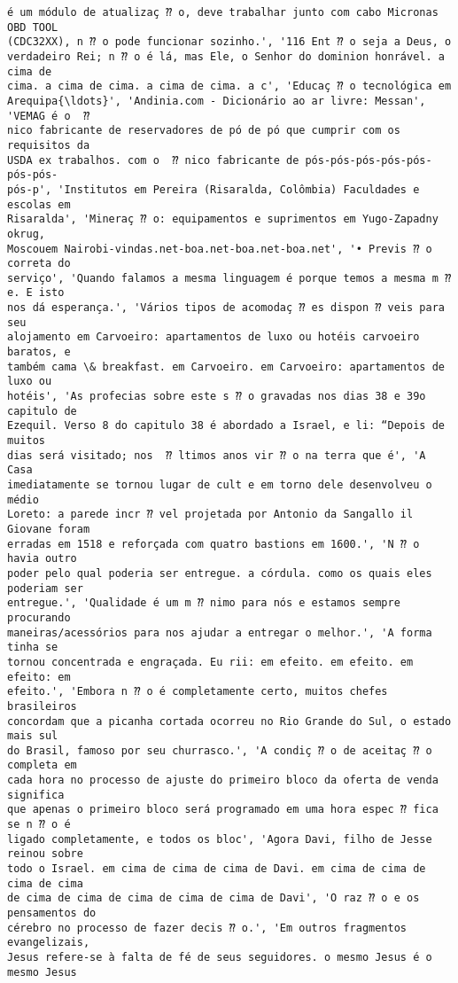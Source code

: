 \documentclass[10pt]{article}
\begin{document}
\begin{Verbatim}[commandchars=\\\{\}]
é um módulo de atualizaç ⁇ o, deve trabalhar junto com cabo Micronas OBD TOOL
(CDC32XX), n ⁇ o pode funcionar sozinho.', '116 Ent ⁇ o seja a Deus, o
verdadeiro Rei; n ⁇ o é lá, mas Ele, o Senhor do dominion honrável. a cima de
cima. a cima de cima. a cima de cima. a c', 'Educaç ⁇ o tecnológica em
Arequipa{\ldots}', 'Andinia.com - Dicionário ao ar livre: Messan', 'VEMAG é o  ⁇
nico fabricante de reservadores de pó de pó que cumprir com os requisitos da
USDA ex trabalhos. com o  ⁇ nico fabricante de pós-pós-pós-pós-pós-pós-pós-
pós-p', 'Institutos em Pereira (Risaralda, Colômbia) Faculdades e escolas em
Risaralda', 'Mineraç ⁇ o: equipamentos e suprimentos em Yugo-Zapadny okrug,
Moscouem Nairobi-vindas.net-boa.net-boa.net-boa.net', '• Previs ⁇ o correta do
serviço', 'Quando falamos a mesma linguagem é porque temos a mesma m ⁇ e. E isto
nos dá esperança.', 'Vários tipos de acomodaç ⁇ es dispon ⁇ veis para seu
alojamento em Carvoeiro: apartamentos de luxo ou hotéis carvoeiro baratos, e
também cama \& breakfast. em Carvoeiro. em Carvoeiro: apartamentos de luxo ou
hotéis', 'As profecias sobre este s ⁇ o gravadas nos dias 38 e 39o capitulo de
Ezequil. Verso 8 do capitulo 38 é abordado a Israel, e li: “Depois de muitos
dias será visitado; nos  ⁇ ltimos anos vir ⁇ o na terra que é', 'A Casa
imediatamente se tornou lugar de cult e em torno dele desenvolveu o médio
Loreto: a parede incr ⁇ vel projetada por Antonio da Sangallo il Giovane foram
erradas em 1518 e reforçada com quatro bastions em 1600.', 'N ⁇ o havia outro
poder pelo qual poderia ser entregue. a córdula. como os quais eles poderiam ser
entregue.', 'Qualidade é um m ⁇ nimo para nós e estamos sempre procurando
maneiras/acessórios para nos ajudar a entregar o melhor.', 'A forma tinha se
tornou concentrada e engraçada. Eu rii: em efeito. em efeito. em efeito: em
efeito.', 'Embora n ⁇ o é completamente certo, muitos chefes brasileiros
concordam que a picanha cortada ocorreu no Rio Grande do Sul, o estado mais sul
do Brasil, famoso por seu churrasco.', 'A condiç ⁇ o de aceitaç ⁇ o completa em
cada hora no processo de ajuste do primeiro bloco da oferta de venda significa
que apenas o primeiro bloco será programado em uma hora espec ⁇ fica se n ⁇ o é
ligado completamente, e todos os bloc', 'Agora Davi, filho de Jesse reinou sobre
todo o Israel. em cima de cima de cima de Davi. em cima de cima de cima de cima
de cima de cima de cima de cima de cima de Davi', 'O raz ⁇ o e os pensamentos do
cérebro no processo de fazer decis ⁇ o.', 'Em outros fragmentos evangelizais,
Jesus refere-se à falta de fé de seus seguidores. o mesmo Jesus é o mesmo Jesus

\end{Verbatim}
\end{document}
